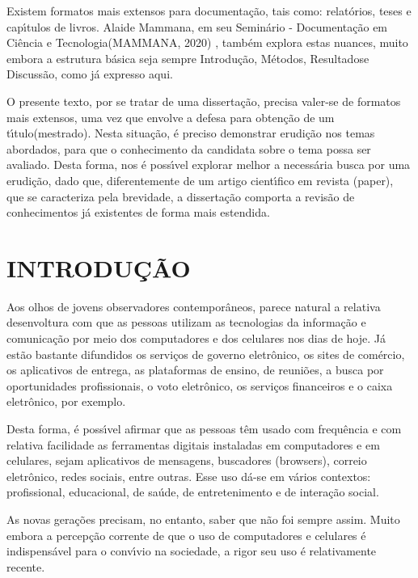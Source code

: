 \documentclass[
12pt,		%
openright,	%
twoside,  %
a4paper,			%
chapter=TITLE,		%
english,			%
french,				%
spanish,			%
brazil				%
]{USPSC-classe/USPSC}
\begin{document}
Existem formatos mais extensos para documenta\c{c}\~ao, tais como: relat\'orios, teses e cap\'{\i}tulos de livros. Alaide Mammana, em seu \textquotedbl Semin\'ario - Documenta\c{c}\~ao em Ci\^encia e Tecnologia\textquotedbl   (MAMMANA, 2020) , tamb\'em explora estas nuances, muito embora a estrutura b\'asica seja sempre \textquotedbl Introdu\c{c}\~ao\textquotedbl , \textquotedbl M\'etodos\textquotedbl , \textquotedbl Resultados\textquotedbl  e \textquotedbl Discuss\~ao\textquotedbl , como j\'a expresso aqui.


O presente texto, por se tratar de uma disserta\c{c}\~ao, precisa valer-se de formatos mais extensos, uma vez que envolve a \textquotedbl defesa para obten\c{c}\~ao de um t\'{\i}tulo\textquotedbl  (mestrado). Nesta situa\c{c}\~ao, \'e preciso demonstrar erudi\c{c}\~ao nos temas abordados, para que o conhecimento da candidata sobre o tema possa ser avaliado. Desta forma, nos \'e poss\'{\i}vel explorar melhor a necess\'aria busca por uma erudi\c{c}\~ao, dado que, diferentemente de um artigo cient\'{\i}fico em revista (\textquotedbl paper\textquotedbl ), que se caracteriza pela brevidade, a disserta\c{c}\~ao  comporta a revis\~ao de conhecimentos j\'a existentes de forma mais estendida.


\chapter[INTRODU\c{C}\~AO]{INTRODU\c{C}\~AO}\label{INTRODU\c{C}\~AO}
Aos olhos de jovens observadores contempor\^aneos, parece natural a relativa desenvoltura com que as pessoas utilizam  as tecnologias da informa\c{c}\~ao e comunica\c{c}\~ao por meio dos  computadores e dos celulares nos dias de hoje. J\'a est\~ao bastante difundidos os servi\c{c}os de governo eletr\^onico, os sites de com\'ercio, os  aplicativos de entrega, as plataformas de ensino, de reuni\~oes, a busca por oportunidades profissionais, o voto eletr\^onico, os servi\c{c}os financeiros e o caixa eletr\^onico, por exemplo.


Desta forma, \'e poss\'{\i}vel afirmar que as pessoas t\^em usado com frequ\^encia e com relativa facilidade as ferramentas digitais instaladas em computadores e em celulares, sejam aplicativos de mensagens, buscadores (browsers), correio eletr\^onico, redes sociais, entre outras. Esse uso d\'a-se em v\'arios contextos: profissional, educacional, de sa\'ude,  de entretenimento e de intera\c{c}\~ao social.


As novas gera\c{c}\~oes precisam, no entanto, saber que n\~ao foi sempre assim. Muito embora a percep\c{c}\~ao corrente de que o uso de computadores e celulares \'e indispens\'avel para o conv\'{\i}vio na sociedade, a rigor seu uso \'e relativamente recente.
\end{document}
